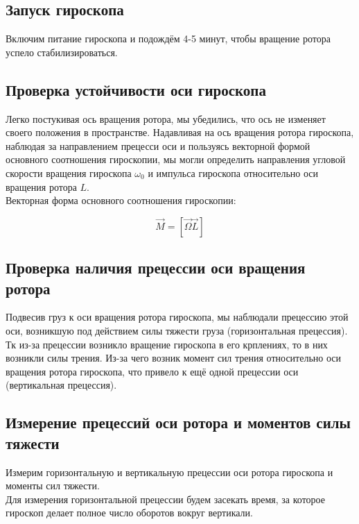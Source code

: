 \documentclass[a4paper]{article}
\begin{document}
\subsection{Запуск гироскопа}

Включим питание гироскопа и подождём 4-5 минут, чтобы вращение ротора успело стабилизироваться.

\subsection{Проверка устойчивости оси гироскопа}

Легко постукивая ось вращения ротора, мы убедились, что ось не изменяет своего положения в пространстве. Надавливая на ось вращения ротора гироскопа, наблюдая за направлением прецесси оси и пользуясь векторной формой основного соотношения гироскопии, мы могли определить направления угловой скорости вращения гироскопа $\omega_0$ и импульса гироскопа относительно оси вращения ротора $L$. \\

Векторная форма основного соотношения гироскопии:

\begin{equation}
	\Vec{M} = [\Vec{\Omega} \Vec{L}]
\end{equation}

\subsection{Проверка наличия прецессии оси вращения ротора}

Подвесив груз к оси вращения ротора гироскопа, мы наблюдали прецессию этой оси, возникшую под действием силы тяжести груза (горизонтальная прецессия). Тк из-за прецессии возникло вращение гироскопа в его крплениях, то в них возникли силы трения. Из-за чего возник момент сил трения относительно оси вращения ротора гироскопа, что привело к ещё одной прецессии оси (вертикальная прецессия).

\subsection{Измерение прецессий оси ротора и моментов силы тяжести}

Измерим горизонтальную и вертикальную прецессии оси ротора гироскопа и моменты сил тяжести. \\

Для измерения горизонтальной прецессии будем засекать время, за  которое гироскоп делает полное число оборотов вокруг вертикали.\\
\end{document}
